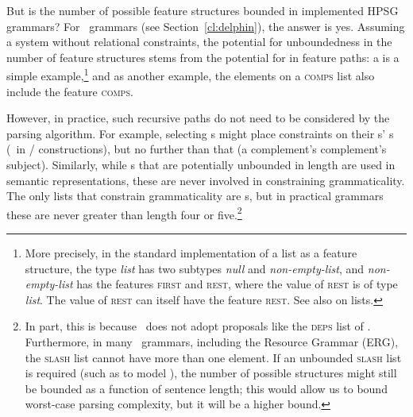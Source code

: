 \documentclass[output=paper
	        ,collection
	        ,collectionchapter
 	        ,biblatex
                ,babelshorthands
                ,newtxmath
                ,draftmode
                ,colorlinks, citecolor=brown
]{langscibook}
\begin{document}
But is the number of possible feature structures bounded
in implemented HPSG grammars?
For \delphin\ grammars (see Section~\ref{cl:delphin}),
the answer is yes.
Assuming a system without relational constraints,
the potential for unboundedness in the number of feature structures
stems from the potential for  in feature paths:
a  is a simple example,\footnote{%
	More precisely, in the standard implementation of a list as a feature structure,
	the type \textit{list} has two subtypes \textit{null} and \textit{non-empty-list}, and
	\textit{non-empty-list} has the features \textsc{first}
	and \textsc{rest}, where the value of \textsc{rest} is of type \textit{list}.
	The value of \textsc{rest} can itself have the feature \textsc{rest}. See also \crossrefchapterw[\page \pageref{page-list-encoding}]{formal-background} on lists.
}
and as another example, the elements on a \textsc{comps} list
also include the feature \textsc{comps}.

However, in practice, such recursive paths do not need to be considered by the parsing algorithm.
For example, selecting s might place constraints on their s' s
(\eg\ in / constructions),
but no further than that (\eg a complement's complement's subject).
Similarly, while s that are potentially unbounded in length are used in semantic representations,
these are never involved in constraining grammaticality.
The only lists that constrain grammaticality are s,
but in practical grammars these are never greater than length four or five.\footnote{%
	In part, this is because \delphin\ does not
	adopt proposals like the \textsc{deps} list of \citet*{BMS2001a}.
	Furthermore, in many \delphin\ grammars, including the  Resource Grammar (ERG),
	the \textsc{slash} list cannot have more than one element.
	If an unbounded \textsc{slash} list is required
	(such as to model ),
	the number of possible structures might still be bounded as a function of sentence length;
	this would allow us to bound worst-case parsing complexity,
	but it will be a higher bound.
}
\end{document}
